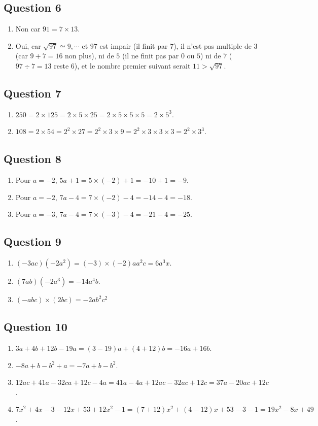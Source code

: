 \documentclass[12 pt]{extarticle}
\theoremstyle{plain}
\begin{document}
\subsection*{Question 6}
\begin{enumerate}
\item Non car $91= 7\times 13$. 
\item Oui, car $\sqrt{97} \simeq 9,\cdots$ et $97$ est impair (il finit par $7$), il n'est pas multiple de $3$ (car $9+7=16$ non plus), ni de $5$ (il ne finit pas par $0$ ou $5$) ni de $7$ ($97\div 7 = 13$ reste $6$), et le nombre premier suivant serait $11>\sqrt{97}$.
\end{enumerate}

\subsection*{Question 7}
\begin{enumerate}
\item $250 = 2 \times 125 = 2\times 5 \times 25 = 2\times 5 \times 5\times 5 = 2\times 5^3$.
\item $108= 2\times 54 = 2^2\times 27 = 2^2\times 3 \times 9 = 2^2\times 3\times 3 \times 3 = 2^2\times 3^3$.
\end{enumerate}
\subsection*{Question 8}
\begin{enumerate}
\item Pour $a=-2$, $5a+1= 5\times (-2)+1 = -10+1 = -9$.
\item Pour $a=-2$, $7a-4 = 7\times(-2)-4 = -14-4=-18$.
\item Pour $a=-3$, $7a-4 = 7\times(-3)-4 = -21-4=-25$.
\end{enumerate}
\subsection*{Question 9}
\begin{enumerate}
\item $(-3ac)(-2a^2) = (-3)\times (-2)aa^2c = 6 a^3x$.
\item $(7ab)(-2a^3) = -14a^4b$.
\item $(-abc)\times(2bc) = -2ab^2c^2$
\end{enumerate}
\subsection*{Question 10}
\begin{enumerate}
\item $3a+4b+12b-19a = (3-19)a + (4+12)b = -16a
+16b$.
\item $-8a+b-b^2+a = -7a+b-b^2$.
\item $12ac+41a-32ca+12c-4a = 41a-4a+12ac-32ac+12c= 37a-20ac+12c$.
\item $7x^2+4x-3-12x+53+12x^2 - 1 = (7+12)x^2 + (4-12)x + 53-3-1 = 19x^2-8x+49$.
\end{enumerate}
\end{document}
